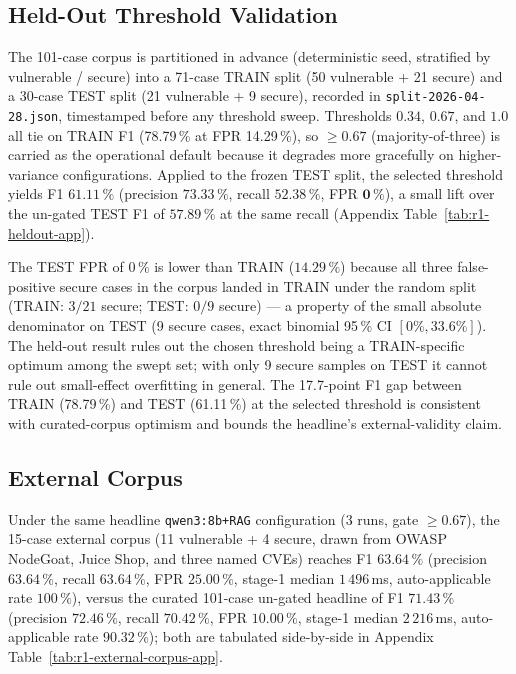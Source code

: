 \subsection{Held-Out Threshold Validation}
\label{sec:eval-r1-heldout}

The 101-case corpus is partitioned in advance (deterministic seed, stratified by vulnerable / secure) into a 71-case TRAIN split (50 vulnerable + 21 secure) and a 30-case TEST split (21 vulnerable + 9 secure), recorded in \texttt{split-2026-04-28.json}, timestamped before any threshold sweep. Thresholds $0.34$, $0.67$, and $1.0$ all tie on TRAIN F1 (78.79\,\% at FPR 14.29\,\%), so $\geq 0.67$ (majority-of-three) is carried as the operational default because it degrades more gracefully on higher-variance configurations. Applied to the frozen TEST split, the selected threshold yields F1 $\mathbf{61.11\,\%}$ (precision $\mathbf{73.33\,\%}$, recall $52.38\,\%$, FPR $\mathbf{0\,\%}$), a small lift over the un-gated TEST F1 of $57.89\,\%$ at the same recall (Appendix Table~\ref{tab:r1-heldout-app}).

The TEST FPR of $0\,\%$ is lower than TRAIN ($14.29\,\%$) because all three false-positive secure cases in the corpus landed in TRAIN under the random split (TRAIN: $3 / 21$ secure; TEST: $0 / 9$ secure) --- a property of the small absolute denominator on TEST (9 secure cases, exact binomial 95\,\% CI $[0\%, 33.6\%]$). The held-out result rules out the chosen threshold being a TRAIN-specific optimum among the swept set; with only 9 secure samples on TEST it cannot rule out small-effect overfitting in general. The 17.7-point F1 gap between TRAIN (78.79\,\%) and TEST (61.11\,\%) at the selected threshold is consistent with curated-corpus optimism and bounds the headline's external-validity claim.

\subsection{External Corpus}
\label{sec:eval-r1-external-corpus}

Under the same headline \texttt{qwen3:8b+RAG} configuration (3 runs, gate $\geq 0.67$), the 15-case external corpus (11 vulnerable + 4 secure, drawn from OWASP NodeGoat, Juice Shop, and three named CVEs) reaches F1 $63.64\,\%$ (precision $63.64\,\%$, recall $63.64\,\%$, FPR $25.00\,\%$, stage-1 median $1\,496$\,ms, auto-applicable rate $100\,\%$), versus the curated 101-case un-gated headline of F1 $71.43\,\%$ (precision $72.46\,\%$, recall $70.42\,\%$, FPR $10.00\,\%$, stage-1 median $2\,216$\,ms, auto-applicable rate $90.32\,\%$); both are tabulated side-by-side in Appendix Table~\ref{tab:r1-external-corpus-app}.

